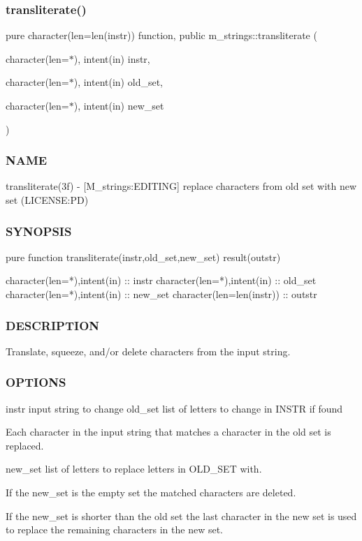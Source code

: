 \subsubsection{\texorpdfstring{transliterate()}{transliterate()}}
{\footnotesize\ttfamily pure character(len=len(instr)) function, public m\+\_\+strings\+::transliterate (\begin{DoxyParamCaption}\item[{character(len=$\ast$), intent(in)}]{instr,  }\item[{character(len=$\ast$), intent(in)}]{old\+\_\+set,  }\item[{character(len=$\ast$), intent(in)}]{new\+\_\+set }\end{DoxyParamCaption})}



\subsubsection*{N\+A\+ME}

transliterate(3f) -\/ \mbox{[}M\+\_\+strings\+:E\+D\+I\+T\+I\+NG\mbox{]} replace characters from old set with new set (L\+I\+C\+E\+N\+SE\+:PD) 

\subsubsection*{S\+Y\+N\+O\+P\+S\+IS}

\begin{DoxyVerb}pure function transliterate(instr,old_set,new_set) result(outstr)

 character(len=*),intent(in)  :: instr
 character(len=*),intent(in)  :: old_set
 character(len=*),intent(in)  :: new_set
 character(len=len(instr))    :: outstr
\end{DoxyVerb}
 \subsubsection*{D\+E\+S\+C\+R\+I\+P\+T\+I\+ON}

Translate, squeeze, and/or delete characters from the input string.

\subsubsection*{O\+P\+T\+I\+O\+NS}

instr input string to change old\+\_\+set list of letters to change in I\+N\+S\+TR if found \begin{DoxyVerb}     Each character in the input string that matches a character in
     the old set is replaced.
\end{DoxyVerb}
 new\+\_\+set list of letters to replace letters in O\+L\+D\+\_\+\+S\+ET with. \begin{DoxyVerb}     If the new_set is the empty set the matched characters are deleted.

     If the new_set is shorter than the old set the last character in the
     new set is used to replace the remaining characters in the new set.
\end{DoxyVerb}
